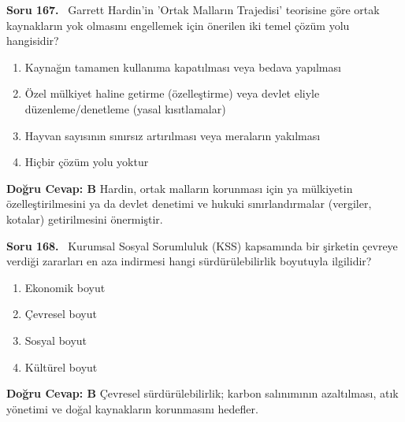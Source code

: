 \documentclass[11pt,a4paper,openany]{book}
\begin{document}
\needspace{5cm}
\vspace{8pt}
\noindent\textbf{\large\sffamily Soru 167.} \ Garrett Hardin'in 'Ortak Malların Trajedisi' teorisine göre ortak kaynakların yok olmasını engellemek için önerilen iki temel çözüm yolu hangisidir?
\begin{enumerate}[label=\Alph*), leftmargin=25pt, topsep=4pt, itemsep=2pt]
    \item Kaynağın tamamen kullanıma kapatılması veya bedava yapılması
    \item Özel mülkiyet haline getirme (özelleştirme) veya devlet eliyle düzenleme/denetleme (yasal kısıtlamalar)
    \item Hayvan sayısının sınırsız artırılması veya meraların yakılması
    \item Hiçbir çözüm yolu yoktur
\end{enumerate}
\vspace{4pt}
\begin{tcolorbox}[title=Cevap ve Açıklama, colback=gray!3!white, colframe=primarycolor!90!black, arc=2mm, fonttitle=\bfseries\sffamily, top=6pt, bottom=6pt]
    \textbf{Doğru Cevap: B}
    \vspace{2pt}
    Hardin, ortak malların korunması için ya mülkiyetin özelleştirilmesini ya da devlet denetimi ve hukuki sınırlandırmalar (vergiler, kotalar) getirilmesini önermiştir.
\end{tcolorbox}
\vspace{10pt}

\needspace{5cm}
\vspace{8pt}
\noindent\textbf{\large\sffamily Soru 168.} \ Kurumsal Sosyal Sorumluluk (KSS) kapsamında bir şirketin çevreye verdiği zararları en aza indirmesi hangi sürdürülebilirlik boyutuyla ilgilidir?
\begin{enumerate}[label=\Alph*), leftmargin=25pt, topsep=4pt, itemsep=2pt]
    \item Ekonomik boyut
    \item Çevresel boyut
    \item Sosyal boyut
    \item Kültürel boyut
\end{enumerate}
\vspace{4pt}
\begin{tcolorbox}[title=Cevap ve Açıklama, colback=gray!3!white, colframe=primarycolor!90!black, arc=2mm, fonttitle=\bfseries\sffamily, top=6pt, bottom=6pt]
    \textbf{Doğru Cevap: B}
    \vspace{2pt}
    Çevresel sürdürülebilirlik; karbon salınımının azaltılması, atık yönetimi ve doğal kaynakların korunmasını hedefler.
\end{tcolorbox}
\vspace{10pt}
\end{document}
